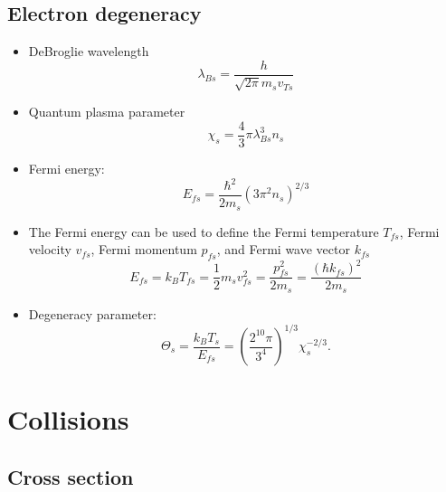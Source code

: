 \documentclass[a4paper,11pt]{report}
\begin{document}
\section{Electron degeneracy}

\begin{itemize}
    \item DeBroglie wavelength
    \begin{equation}
        \lambda_{Bs} = \dfrac{h}{\sqrt{2 \pi} m_s v_{Ts}}
    \end{equation}
    \item Quantum plasma parameter
    \begin{equation}
        \chi_s = \frac{4}{3} \pi \lambda_{Bs}^3 n_s
    \end{equation}
    
    \item Fermi energy:
    \begin{equation}
        E_{fs} = \frac{\hbar^2}{2m_s} \left( 3 \pi^2 n_s \right)^{2/3}
    \end{equation}

    \item The Fermi energy can be used to define the Fermi temperature $T_{fs}$, Fermi velocity $v_{fs}$, Fermi momentum $p_{fs}$, and Fermi wave vector $k_{fs}$
    \begin{equation}
        E_{fs} = k_B T_{fs} = \frac{1}{2} m_s v_{fs}^2  = \frac{p_{fs}^2}{2m_s} = \frac{\left ( \hbar k_{fs} \right ) ^2}{2m_s}
    \end{equation}

    \item Degeneracy parameter:
    \begin{equation}
        \Theta_s = \frac{k_B T_s}{E_{fs}} = \left( \frac{2^{10} \pi}{3^4} \right)^{1/3} \chi_s^{-2/3}.
    \end{equation}
\end{itemize}

\chapter{Collisions}
\section{Cross section}
\end{document}
